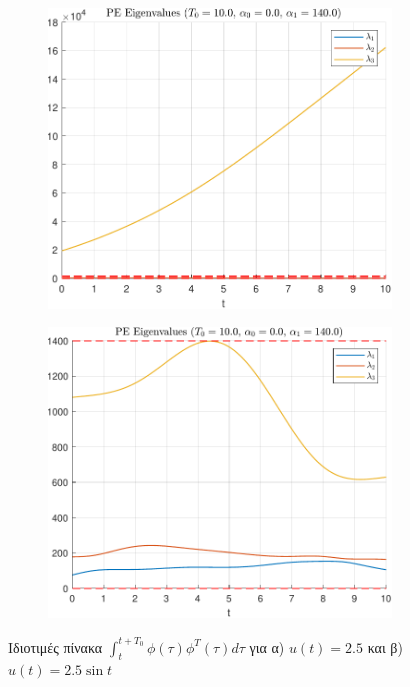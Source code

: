 \documentclass[a4paper,12pt]{article}
\begin{document}
\begin{figure}[h!]
    \centering
    \begin{subfigure}{0.45\textwidth}
        \centering
        \includegraphics[width=\linewidth]{plot/task1_PE_eigenvalues_1.pdf}
        \caption{}
        \label{fig:task1_PE_eigenvalues_1}
    \end{subfigure}
    \hfill
    \begin{subfigure}{0.45\textwidth}
        \centering
        \includegraphics[width=\linewidth]{plot/task1_PE_eigenvalues_2.pdf}
        \caption{}
        \label{fig:task1_PE_eigenvalues_2}
    \end{subfigure}
    \caption{Ιδιοτιμές πίνακα $\int_{t}^{t+T_0} \phi(\tau) \phi^T(\tau) d\tau$ για 
    α) $u(t) = 2.5$ και β) $u(t) = 2.5 \sin t$}
    \label{fig:task1_PE_eigenvalues}
\end{figure}
\end{document}
